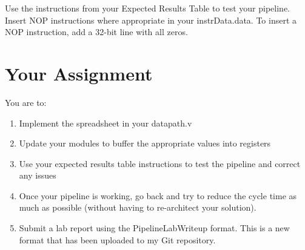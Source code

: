 Use the instructions from your Expected Results Table to test your pipeline.  Insert NOP instructions where appropriate in your instrData.data.  To insert a NOP instruction, add a 32-bit line with all zeros.

\section{Your Assignment}

You are to:
\begin{enumerate}
\item Implement the spreadsheet in your datapath.v
\item Update your modules to buffer the appropriate values into registers
\item Use your expected results table instructions to test the pipeline and correct any issues
\item Once your pipeline is working, go back and try to reduce the cycle time as much as possible (without having to re-architect your solution).
\item Submit a lab report using the PipelineLabWriteup format.  This is a new format that has been uploaded to my Git repository.
\end{enumerate} 
